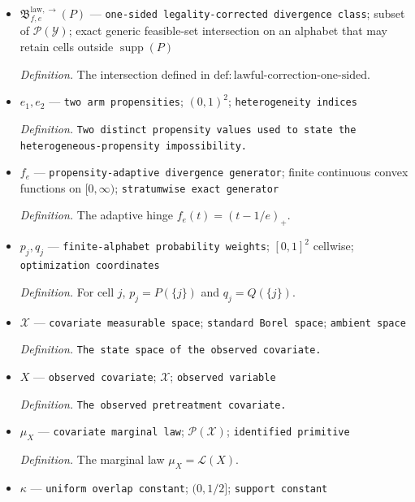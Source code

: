 \documentclass{article}
\begin{document}
\begin{itemize}
  \par\smallskip\noindent\emph{Definition.} The continuous maps defined in \(\mathrm{def:cdf\text{-}maps\text{-}one\text{-}sided}\).
  \item \(\mathfrak B^{\mathrm{law},\to}_{f,e}(P)\) --- \texttt{one-\allowbreak{}sided legality-\allowbreak{}corrected divergence class}; subset of \(\mathcal P(\mathcal Y)\); exact generic feasible-set intersection on an alphabet that may retain cells outside \(\operatorname{supp}(P)\)
  \par\smallskip\noindent\emph{Definition.} The intersection defined in \(\mathrm{def:lawful\text{-}correction\text{-}one\text{-}sided}\).
  \item \(e_1,e_2\) --- \texttt{two arm propensities}; \((0,1)^2\); \texttt{heterogeneity indices}
  \par\smallskip\noindent\emph{Definition.} \texttt{Two distinct propensity values used to state the heterogeneous-\allowbreak{}propensity impossibility.}
  \item \(f_e\) --- \texttt{propensity-\allowbreak{}adaptive divergence generator}; finite continuous convex functions on \([0,\infty)\); \texttt{stratumwise exact generator}
  \par\smallskip\noindent\emph{Definition.} The adaptive hinge \(f_e(t)=(t-1/e)_+\).
  \item \(p_j,q_j\) --- \texttt{finite-\allowbreak{}alphabet probability weights}; \([0,1]^2\) cellwise; \texttt{optimization coordinates}
  \par\smallskip\noindent\emph{Definition.} For cell \(j\), \(p_j=P(\{j\})\) and \(q_j=Q(\{j\})\).
  \item \(\mathcal X\) --- \texttt{covariate measurable space}; \texttt{standard Borel space}; \texttt{ambient space}
  \par\smallskip\noindent\emph{Definition.} \texttt{The state space of the observed covariate.}
  \item \(X\) --- \texttt{observed covariate}; \(\mathcal X\); \texttt{observed variable}
  \par\smallskip\noindent\emph{Definition.} \texttt{The observed pretreatment covariate.}
  \item \(\mu_X\) --- \texttt{covariate marginal law}; \(\mathcal P(\mathcal X)\); \texttt{identified primitive}
  \par\smallskip\noindent\emph{Definition.} The marginal law \(\mu_X=\mathcal L(X)\).
  \item \(\kappa\) --- \texttt{uniform overlap constant}; \((0,1/2]\); \texttt{support constant}

\end{itemize}
\end{document}
